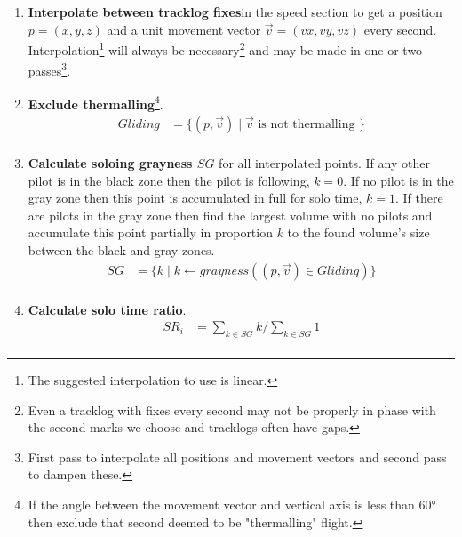 \documentclass[gap.tex]{subfiles}
\begin{document}
\begin{enumerate}
    \item \textbf{Interpolate between tracklog fixes}\footnotemark in the speed
        section to get a position \(p = (x, y, z)\) and a unit movement vector
        \(\vec{v} = (vx, vy, vz)\) every second. Interpolation\footnote{The
        suggested interpolation to use is linear.} will always be
        necessary\footnote{Even a tracklog with fixes every second may not be
        properly in phase with the second marks we choose and tracklogs often
        have gaps.} and may be made in one or two passes\footnote{First pass to
        interpolate all positions and movement vectors and second pass to
        dampen these.}.

    \item \textbf{Exclude thermalling}\footnote{If the angle between the
        movement vector and vertical axis is less than 60° then exclude that
        second deemed to be "thermalling" flight.}.
        \begin{align*}
            Gliding &= \{ (p, \vec{v}) \mid \vec{v} \text{ is not thermalling }\} \\
        \end{align*}
    

    \item \textbf{Calculate soloing grayness \(SG\)} for all interpolated
        points. If any other pilot is in the black zone then the pilot is
        following, \(k = 0\). If no pilot is in the gray zone then this point
        is accumulated in full for solo time, \(k = 1\). If there are pilots in
        the gray zone then find the largest volume with no pilots and
        accumulate this point partially in proportion \(k\) to the found
        volume's size between the black and gray zones.
        \begin{align*}
            SG &= \{ k \mid k \leftarrow grayness ((p, \vec{v}) \in Gliding)\} \\
        \end{align*}
    
    \item \textbf{Calculate solo time ratio}.
        \begin{align*}
            SR_i &= \sum_{k \in SG} k / \sum_{k \in SG} 1 \\
        \end{align*}
    

\end{enumerate}
\end{document}
